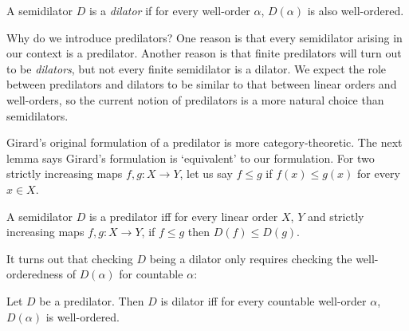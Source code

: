 \documentclass{mhkr}
\newcommand{\ACA}{\mathsf{ACA}}
\begin{document}
\begin{definition}
    A semidilator $D$ is a \emph{dilator} if for every well-order $\alpha$, $D(\alpha)$ is also well-ordered.
\end{definition}

Why do we introduce predilators? One reason is that every semidilator arising in our context is a predilator. Another reason is that finite predilators will turn out to be \emph{dilators}, but not every finite semidilator is a dilator. We expect the role between predilators and dilators to be similar to that between linear orders and well-orders, so the current notion of predilators is a more natural choice than semidilators.

Girard's original formulation of a predilator is more category-theoretic. The next lemma says Girard's formulation is `equivalent' to our formulation. For two strictly increasing maps $f, g\colon X\to Y$, let us say $f\le g$ if $f(x)\le g(x)$ for every $x\in X$.
\begin{lemma}[$\ACA_0$] \label{Lemma: Monotone semidilator iff predilator}
    A semidilator $D$ is a predilator iff for every linear order $X$, $Y$ and strictly increasing maps $f,g\colon X\to Y$, if $f\le g$ then $D(f)\le D(g)$.
\end{lemma}

It turns out that checking $D$ being a dilator only requires checking the well-orderedness of $D(\alpha)$ for countable $\alpha$:
\begin{lemma} \label{Lemma: Being a dilator is captured by countable WOs}
    Let $D$ be a predilator. Then $D$ is dilator iff for every countable well-order $\alpha$, $D(\alpha)$ is well-ordered.
\end{lemma}
\end{document}
